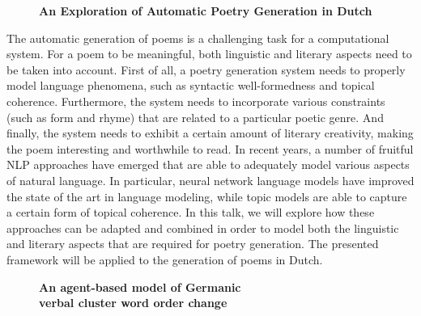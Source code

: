 \documentclass[10pt, a4paper, twopage, headinclude, footinclude, BCOR5mm]{book}
\begin{document}
\newpage

\begin{figure}[t!]
\centering
\large\textbf{An Exploration of Automatic Poetry Generation in Dutch}
\vspace*{0.5cm}
\end{figure}


\begin{table}[t!]
\end{table} 
\noindent
The automatic generation of poems is a challenging task for a computational system. For a poem to be meaningful, both linguistic and literary aspects need to be taken into account. First of all, a poetry generation system needs to properly model language phenomena, such as syntactic well-formedness and topical coherence. Furthermore, the system needs to incorporate various constraints (such as form and rhyme) that are related to a particular poetic genre. And finally, the system needs to exhibit a certain amount of literary creativity, making the poem interesting and worthwhile to read.  In recent years, a number of fruitful NLP approaches have emerged that are able to adequately model various aspects of natural language. In particular, neural network language models have improved the state of the art in language modeling, while topic models are able to capture a certain form of topical coherence. In this talk, we will explore how these approaches can be adapted and combined in order to model both the linguistic and literary aspects that are required for poetry generation. The presented framework will be applied to the generation of poems in Dutch.   

\newpage

\begin{figure}[t!]
\centering
\large\textbf{An agent-based model of Germanic \\ verbal cluster word order change}
\vspace*{0.5cm}
\end{figure}
\end{document}
